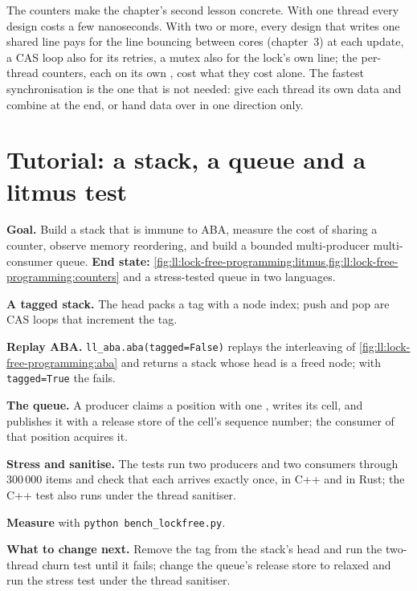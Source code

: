 The counters make the chapter's second lesson concrete. With one thread every design costs a few nanoseconds. With two or
more, every design that writes one shared line pays for the line bouncing between cores (chapter~3) at each update, a CAS
loop also for its retries, a mutex also for the lock's own line; the per-thread counters, each on its own ,
cost what they cost alone. The fastest synchronisation is the one that is not needed: give each thread its own data and
combine at the end, or hand data over in one direction only.

\section{Tutorial: a stack, a queue and a litmus test}\label{tut:ll:lock-free-programming:tut}

\begin{tutorial}
\textbf{Goal.} Build a  stack that is immune to ABA, measure the cost of sharing a counter, observe memory
reordering, and build a bounded multi-producer multi-consumer queue. \textbf{End state:}
\cref{fig:ll:lock-free-programming:litmus,fig:ll:lock-free-programming:counters} and a stress-tested queue in two languages.
\begin{tutsteps}
\item \textbf{A tagged stack.} The head packs a tag with a node index; push and pop are CAS loops that increment the tag.
\label{lst:ll:lock-free-programming:stack}
\item \textbf{Replay ABA.} \texttt{ll\_aba.aba(tagged=False)} replays the interleaving of \cref{fig:ll:lock-free-programming:aba}
and returns a stack whose head is a freed node; with \texttt{tagged=True} the  fails.
\item \textbf{The queue.} A producer claims a position with one , writes its cell, and publishes it with a
release store of the cell's sequence number; the consumer of that position acquires it.
\label{lst:ll:lock-free-programming:push}
\item \textbf{Stress and sanitise.} The tests run two producers and two consumers through 300\,000 items and check that each
arrives exactly once, in C++ and in Rust; the C++ test also runs under the thread sanitiser.
\item \textbf{Measure} with \texttt{python bench\_lockfree.py}.
\end{tutsteps}
\textbf{What to change next.} Remove the tag from the stack's head and run the two-thread churn test until it fails; change the
queue's release store to relaxed and run the stress test under the thread sanitiser.
\end{tutorial}

